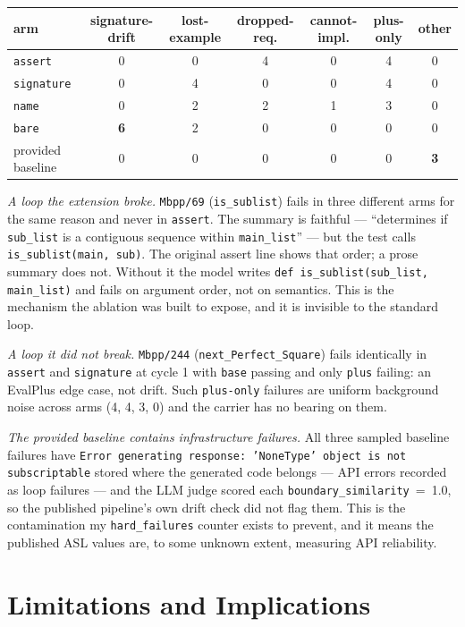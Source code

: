 \documentclass[10pt]{article}
\newcommand{\code}[1]{\texttt{\small #1}}
\begin{document}
\begin{center}\small
\begin{tabular}{lcccccc}
\toprule
arm & signature-drift & lost-example & dropped-req. & cannot-impl. & plus-only & other \\
\midrule
\code{assert} & 0 & 0 & 4 & 0 & 4 & 0 \\
\code{signature} & 0 & 4 & 0 & 0 & 4 & 0 \\
\code{name} & 0 & 2 & 2 & 1 & 3 & 0 \\
\code{bare} & \textbf{6} & 2 & 0 & 0 & 0 & 0 \\
provided baseline & 0 & 0 & 0 & 0 & 0 & \textbf{3} \\
\bottomrule
\end{tabular}
\end{center}

\emph{A loop the extension broke.} \code{Mbpp/69} (\code{is\_sublist}) fails in
three different arms for the same reason and never in \code{assert}. The
summary is faithful --- ``determines if \code{sub\_list} is a contiguous
sequence within \code{main\_list}'' --- but the test calls
\code{is\_sublist(main, sub)}. The original assert line shows that order; a
prose summary does not. Without it the model writes
\code{def is\_sublist(sub\_list, main\_list)} and fails on argument order, not
on semantics. This is the mechanism the ablation was built to expose, and it is
invisible to the standard loop.

\emph{A loop it did not break.} \code{Mbpp/244} (\code{next\_Perfect\_Square})
fails identically in \code{assert} and \code{signature} at cycle 1 with
\code{base} passing and only \code{plus} failing: an EvalPlus edge case, not
drift. Such \code{plus-only} failures are uniform background noise across arms
(4, 4, 3, 0) and the carrier has no bearing on them.

\emph{The provided baseline contains infrastructure failures.} All three
sampled baseline failures have \code{Error generating response: 'NoneType'
object is not subscriptable} stored where the generated code belongs --- API
errors recorded as loop failures --- and the LLM judge scored each
\code{boundary\_similarity}~=~1.0, so the published pipeline's own drift check
did not flag them. This is the contamination my \code{hard\_failures} counter
exists to prevent, and it means the published ASL values are, to some unknown
extent, measuring API reliability.

\section{Limitations and Implications}
\end{document}
